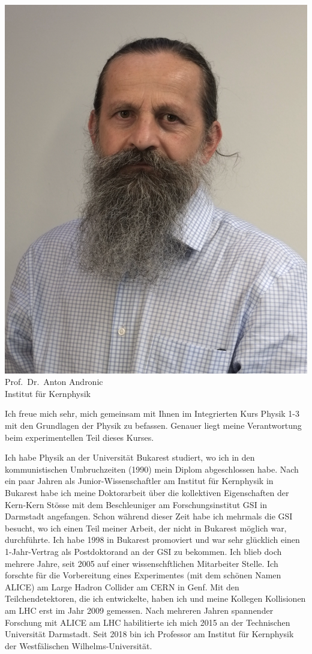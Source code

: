 \begin{multicols}{2}
\begin{center}
\includegraphics[width=0.8\columnwidth]{res/vorstellungsfotos/andronic.png}\\
\smallskip
Prof.\ Dr.\ Anton Andronic\\
Institut für Kernphysik
\end{center}

Ich freue mich sehr, mich gemeinsam mit Ihnen im Integrierten Kurs Physik 1-3 mit den Grundlagen der Physik zu befassen. Genauer liegt meine Verantwortung beim experimentellen Teil dieses Kurses.

Ich habe Physik an der Universität Bukarest studiert, wo ich in den kommunistischen Umbruchzeiten (1990) mein Diplom abgeschlossen habe. Nach ein paar Jahren als Junior-Wissenschaftler am Institut für Kernphysik in Bukarest habe ich meine Doktorarbeit über die kollektiven Eigenschaften der Kern-Kern Stösse mit dem Beschleuniger am Forschungsinstitut GSI in Darmstadt angefangen. Schon
während dieser Zeit habe ich mehrmals die GSI besucht, wo ich einen Teil meiner Arbeit, der nicht in Bukarest möglich war, durchführte. Ich habe 1998 in Bukarest promoviert und war sehr glücklich einen 1-Jahr-Vertrag als Postdoktorand an der GSI zu bekommen. Ich blieb doch mehrere Jahre, seit 2005 auf einer wissenschftlichen Mitarbeiter Stelle. Ich forschte für die Vorbereitung eines Experimentes (mit dem schönen Namen ALICE) am Large Hadron Collider am CERN in Genf. Mit den Teilchendetektoren, die ich entwickelte, haben ich und meine Kollegen Kollisionen am LHC erst im Jahr 2009 gemessen. Nach mehreren Jahren spannender Forschung mit ALICE am LHC habilitierte ich mich 2015 an der Technischen Universität Darmstadt. Seit 2018 bin ich Professor am Institut für Kernphysik der Westfälischen Wilhelms-Universität.


\end{multicols}
